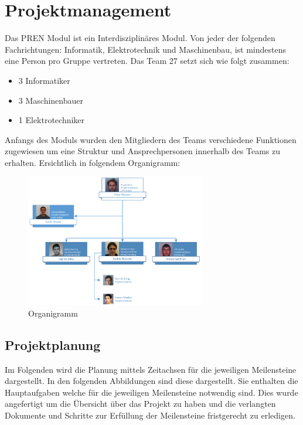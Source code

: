\section{Projektmanagement}
Das PREN Modul ist ein Interdisziplinäres Modul. Von jeder der folgenden Fachrichtungen: Informatik, Elektrotechnik und Maschinenbau, ist mindestens eine Person pro Gruppe vertreten. Das Team 27 setzt sich wie folgt zusammen:
\begin{itemize}
	\item 3 Informatiker
	\item 3 Maschinenbauer
	\item 1 Elektrotechniker
\end{itemize}
Anfangs des Moduls wurden den Mitgliedern des Teams verschiedene Funktionen zugewiesen um eine Struktur und Ansprechpersonen innerhalb des Teams zu erhalten. Ersichtlich in folgendem Organigramm:
\begin{figure}[h!]
	\centering
	\includegraphics[width=0.7\textwidth]{fig/Organigramm.png}
	\caption{Organigramm}
	\label{fig:Organigramm}
\end{figure}

\subsection{Projektplanung}
Im Folgenden wird die Planung mittels Zeitachsen für die jeweiligen Meilensteine dargestellt. In den folgenden Abbildungen sind diese dargestellt. Sie enthalten die Hauptaufgaben welche für die jeweiligen Meilensteine notwendig sind. Dies wurde angefertigt um die Übersicht über das Projekt zu haben und die verlangten Dokumente und Schritte zur Erfüllung der Meilensteine fristgerecht zu erledigen.


